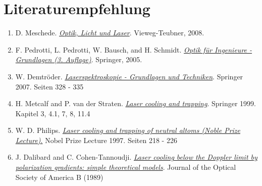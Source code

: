\documentclass[
class=book,
accentcolor=1b,
custommargins=geometry,
fontsize=11pt,
thesis={type=Versuchsanleitung},
ruledheaders=all,
headline=false,
instbox=false,
marginpar=false,
title=small,
ignore-missing-data=true,
twoside=false,
logofile=apqdesign/tuda_logo.pdf,
pdfa=false %
]{apqpub}
\begin{document}
\chapter{Literaturempfehlung}\label{sec:LE}

\begin{enumerate}[label=\roman*.]
	\item D. Meschede. \href{https://doi.org/10.1007/978-3-8348-9288-1}{\textit{Optik, Licht und Laser}}. Vieweg-Teubner, 2008.
	
	\item F. Pedrotti, L. Pedrotti, W. Bausch, and H. Schmidt. \href{https://doi.org/10.1007/b139018}{\textit{Optik für Ingenieure - Grundlagen (3. Auflage)}}. Springer, 2005.
	
	\item W. Demtröder. \href{https://hds.hebis.de/ulbda/Record/HEB19139341X}{\textit{Laserspektroskopie - Grundlagen und Techniken}}. Springer 2007. Seiten 328 - 335
	
	\item H. Metcalf and P. van der Straten. \href{https://link.springer.com/book/10.1007/978-1-4612-1470-0}{\textit{Laser cooling and trapping}}. Springer 1999. Kapitel 3, 4.1, 7, 8, 11.4
	
	\item W. D. Philips. \href{https://www.nobelprize.org/prizes/physics/1997/phillips/lecture/}{\textit{Laser cooling and trapping of neutral altoms (Noble Prize Lecture)}.} Nobel Prize Lecture 1997. Seiten 218 - 226
	
	\item J. Dalibard and C. Cohen-Tannoudji. \href{https://doi.org/10.1364/JOSAB.6.002023}{\textit{Laser cooling below the Doppler limit by polarization gradients: simple theoretical models}}. Journal of the Optical Society of America B (1989)
\end{enumerate}
\end{document}
